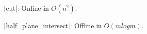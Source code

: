 \begin{compactenum}
\item \texttt|cut|: Online in $O(n^2)$.
\item \texttt|half_plane_intersect|: Offline in $O(mlogm)$.
\end{compactenum}
\inputminted{cpp}{src/geometry/2d-geometry/half-plane-intersection.cpp.com}
